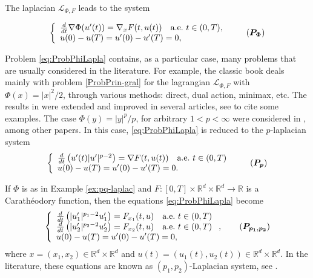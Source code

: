 \documentclass[twoside]{article}
\theoremstyle{remark}
\renewcommand{\b}[1]{\boldsymbol{#1}}
\newcommand{\rr}{\mathbb{R}}
\newcounter{example}[section]
\begin{document}
The laplacian $\mathcal{L}_{\Phi,F}$ leads to the system

\begin{equation}\label{eq:ProbPhiLapla}
    \left\{%
\begin{array}{ll}
  \frac{d}{dt} \nabla \Phi(u'(t))= \nabla_{x}F(t,u(t)) \quad \hbox{a.e.}\ t \in (0,T),\\
    u(0)-u(T)=u'(0)-u'(T)=0,
\end{array}%
\right. \tag{$\b{P_{\Phi}}$}
\end{equation}

Problem \eqref{eq:ProbPhiLapla} contains, as a particular case, many problems that are usually considered in the literature.  For example, the classic book  \cite{mawhin2010critical} deals mainly with problem \eqref{ProbPrin-gral} for the lagrangian $\mathcal{L}_{\Phi,F}$ with $\Phi(x)=|x|^2/2$, through various methods: direct, dual action, minimax, etc. The results in \cite{mawhin2010critical} were extended and improved in several articles,  see  \cite{tang1995periodic,tang1998periodic,wu1999periodic,tang2001periodic,zhao2004periodic}  to cite some examples. The case $\Phi(y)=|y|^p/p$, for arbitrary $1<p<\infty$ were considered in  \cite{Tian2007192,tang2010periodic}, among other papers. In this case, \eqref{eq:ProbPhiLapla} is reduced to the $p$-laplacian system
\begin{equation}\label{ProbP-lapla}
    \left\{%
\begin{array}{ll}
   \frac{d}{dt}\left(u'(t)|u'|^{p-2}\right) = \nabla F(t,u(t)) \quad \hbox{a.e.}\ t \in (0,T)\\
    u(0)-u(T)=u'(0)-u'(T)=0.
\end{array}%
\right.\tag{$\b{P_p}$}
\end{equation}


If $\Phi$ is as in Example \ref{ex:pq-laplac} and  $F:[0,T]\times\rr^d\times\rr^d\to\rr$ is a Carath\'eodory function, then the equations \eqref{eq:ProbPhiLapla} become
\begin{equation}\label{eq:sist-p_lapa}
    \left\{%
\begin{array}{ll}
  \frac{d}{dt}\left(|u_1'|^{p_1-2}u_1'\right)=F_{x_1}(t,u) \quad \hbox{a.e.}\ t \in (0,T)\\
  \frac{d}{dt}\left(|u_2'|^{p_2-2}u_2'\right)=F_{x_2}(t,u) \quad \hbox{a.e.}\ t \in (0,T)\\
   u(0)-u(T)=u'(0)-u'(T)=0,
\end{array}%
\right., \tag{$\b{P_{p_1,p_2}}$}
\end{equation}
where $x=(x_1,x_2)\in\rr^d\times\rr^d$ and $u(t)=(u_1(t),u_2(t))\in\rr^d\times\rr^d$. In the literature, these equations are known as $(p_1,p_2)$-Laplacian system, see
\cite{yang2013existence,pasca2016periodic,yang2012periodic,pasca2010periodic,pacsca2010some,pasca2011some,li2014periodic}.
\end{document}
